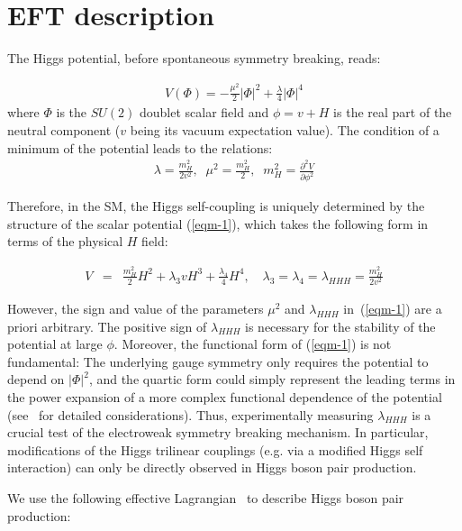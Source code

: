 	\section{EFT description} \label{sec:EFT_Description}

The Higgs potential, before spontaneous symmetry breaking, reads: 

\begin{eqnarray}
  V(\Phi) = - \frac{\mu^2}{2}\left|\Phi \right|^2
  +\frac{\lambda}{4} \left|\Phi \right|^4
  \label{eqm-1}
\end{eqnarray}
where $\Phi$ is the $SU(2)$ doublet scalar field and $\phi = v + H$ is the real part of the neutral component ($v$ being its vacuum expectation value).
The condition of a minimum of the potential leads to the relations:
\begin{eqnarray}
  \lambda = \frac{m_H^2}{2 v^2}, \;\;  \mu^2 = \frac{m_H^2}{2},
  \;\; m_H^2 = \frac{\partial^2 V}{\partial \phi^2}
   \label{eqm-2}
\end{eqnarray}

Therefore, in the SM, the Higgs self-coupling is uniquely determined by the structure of the scalar potential (\ref{eqm-1}), which takes the following
form in terms of the physical $H$ field:

\begin{eqnarray}
  V &=& \frac{m_H^2}{2}H^2 + \lambda_3 v H^3 + \frac{\lambda_4}{4} H^4,
\quad
 \lambda_3 = \lambda_4 = \lambda_{HHH} = \frac{m_H^2}{2v^2} \label{eqm-3}
\end{eqnarray}

However, the sign and value of the parameters $\mu^2$ and $\lambda_{HHH}$ in~(\ref{eqm-1}) are a priori arbitrary.
The positive sign of $\lambda_{HHH}$ is necessary for the stability of the potential at large $\phi$.
Moreover, the functional form of (\ref{eqm-1}) is not fundamental: The underlying gauge
symmetry only requires the potential to depend on $\left| \Phi \right|^2$, and the quartic form could simply represent the leading terms in
the power expansion of a more complex functional dependence of the potential (see~\cite{Mangano:2019kji} for detailed considerations).
Thus, experimentally measuring $\lambda_{HHH}$ is a crucial test of the electroweak symmetry breaking mechanism.
In particular, modifications of the Higgs trilinear couplings (e.g. via a modified Higgs self interaction) can only be directly observed in Higgs boson pair production.

We use the following effective Lagrangian~\cite{deFlorian:2016spz, Carvalho:2015ttv} to describe Higgs boson pair production:


